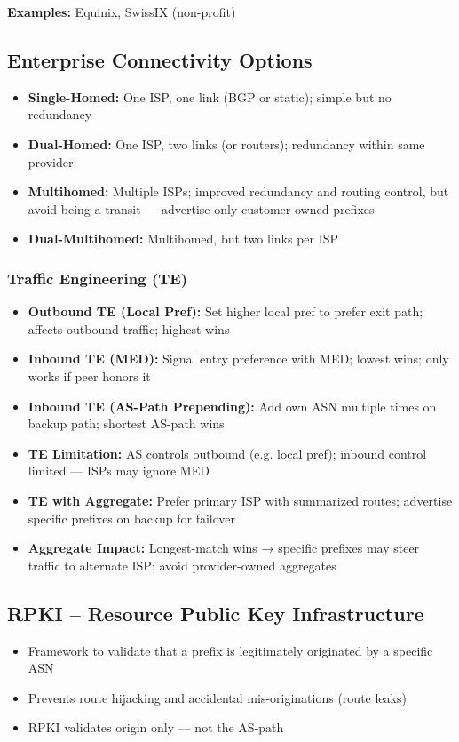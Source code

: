 \begin{multicols*}{5}
		\textbf{Examples:} Equinix, SwissIX (non-profit)
		
		\subsection{Enterprise Connectivity Options}
		\begin{itemize}
			\item \textbf{Single-Homed:} One ISP, one link (BGP or static); simple but no redundancy
			\item \textbf{Dual-Homed:} One ISP, two links (or routers); redundancy within same provider
			\item \textbf{Multihomed:} Multiple ISPs; improved redundancy and routing control, but avoid being a transit — advertise only customer-owned prefixes
			\item \textbf{Dual-Multihomed:} Multihomed, but two links per ISP
		\end{itemize}
		
		\subsubsection*{Traffic Engineering (TE)}
		\begin{itemize}
			\item \textbf{Outbound TE (Local Pref):} Set higher local pref to prefer exit path; affects outbound traffic; highest wins
			\item \textbf{Inbound TE (MED):} Signal entry preference with MED; lowest wins; only works if peer honors it
			\item \textbf{Inbound TE (AS-Path Prepending):} Add own ASN multiple times on backup path; shortest AS-path wins
			\item \textbf{TE Limitation:} AS controls outbound (e.g. local pref); inbound control limited — ISPs may ignore MED
			\item \textbf{TE with Aggregate:} Prefer primary ISP with summarized routes; advertise specific prefixes on backup for failover
			\item \textbf{Aggregate Impact:} Longest-match wins → specific prefixes may steer traffic to alternate ISP; avoid provider-owned aggregates
		\end{itemize}
		
		\subsection{RPKI – Resource Public Key Infrastructure}
		\begin{itemize}
			\item Framework to validate that a prefix is legitimately originated by a specific ASN
			\item Prevents route hijacking and accidental mis-originations (route leaks)
			\item RPKI validates origin only — not the AS-path
		\end{itemize}
		

\end{multicols*}
